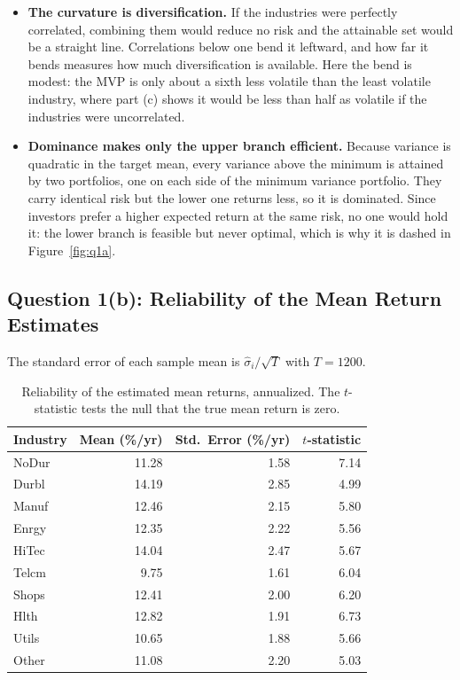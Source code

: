 \documentclass[11pt]{article}
\begin{document}
\begin{itemize}
\setlength{\itemsep}{6pt}\setlength{\parskip}{0pt}

\item \textbf{The curvature is diversification.} If the industries were
perfectly correlated, combining them would reduce no risk and the attainable
set would be a straight line. Correlations below one bend it leftward, and how
far it bends measures how much diversification is available. Here the bend is
modest: the MVP is only about a sixth less volatile than the least volatile
industry, where part (c) shows it would be less than half as volatile if the
industries were uncorrelated.

\item \textbf{Dominance makes only the upper branch efficient.} Because
variance is quadratic in the target mean, every variance above the minimum is
attained by two portfolios, one on each side of the minimum variance
portfolio. They carry identical risk but the lower one returns less, so it is
dominated. Since investors prefer a higher expected return at the same risk,
no one would hold it: the lower branch is feasible but never optimal, which is
why it is dashed in Figure~\ref{fig:q1a}.

\end{itemize}

\subsection{Question 1(b): Reliability of the Mean Return Estimates}

The standard error of each sample mean is $\hat\sigma_i/\sqrt{T}$ with
$T = 1200$.

\begin{table}[H]
\centering
\caption{Reliability of the estimated mean returns, annualized. The
$t$-statistic tests the null that the true mean return is zero.}
\begin{tabular}{lrrr}
\toprule
Industry & Mean (\%/yr) & Std.\ Error (\%/yr) & $t$-statistic \\
\midrule
NoDur & 11.28 & 1.58 & 7.14 \\
Durbl & 14.19 & 2.85 & 4.99 \\
Manuf & 12.46 & 2.15 & 5.80 \\
Enrgy & 12.35 & 2.22 & 5.56 \\
HiTec & 14.04 & 2.47 & 5.67 \\
Telcm & 9.75 & 1.61 & 6.04 \\
Shops & 12.41 & 2.00 & 6.20 \\
Hlth & 12.82 & 1.91 & 6.73 \\
Utils & 10.65 & 1.88 & 5.66 \\
Other & 11.08 & 2.20 & 5.03 \\
\bottomrule
\end{tabular}
\label{tab:q1b_rel}
\end{table}
\end{document}
